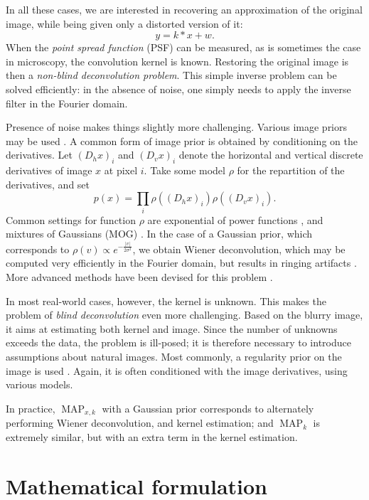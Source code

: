 \documentclass[french,a4paper]{article}
\theoremstyle{plain}
\theoremstyle{definition}
\theoremstyle{remark}
\DeclareMathOperator{\MAP}{MAP}
\begin{document}
In all these cases, we are interested in recovering an approximation of the original image, while being given only a distorted version of it:
\[
y = k * x + w.
\]
When the \emph{point spread function} (PSF) can be measured, as is sometimes the case in microscopy, the convolution kernel is known.
Restoring the original image is then a \emph{non-blind deconvolution problem}.
This simple inverse problem can be solved efficiently: in the absence of noise, one simply needs to apply the inverse filter in the Fourier domain.

Presence of noise makes things slightly more challenging.
Various image priors may be used \cite{sun2014good}.
A common form of image prior is obtained by conditioning on the derivatives. Let $(D_h x)_i$ and $(D_v x)_i$ denote the horizontal and vertical discrete derivatives of image $x$ at pixel $i$.
Take some model $\rho$ for the repartition of the derivatives, and set
\[
p(x) = \prod_i \rho((D_h x)_i) \rho((D_v x)_i) .
\]
Common settings for function $\rho$ are exponential of power functions \cite{krishnan2009fast,levin2009understanding}, and mixtures of Gaussians (MOG) \cite{levin2011efficient,fergus2006removing}.
In the case of a Gaussian prior, which corresponds to $\rho(v) \propto e^{-\frac{|v|}{2\sigma^2}}$, we obtain Wiener deconvolution, which may be computed very efficiently in the Fourier domain, but results in ringing artifacts \cite{shan2008high}.
More advanced methods have been devised for this problem \cite{sun2014good,schmidt2013discriminative}.



In most real-world cases, however, the kernel is unknown. This makes the problem of \emph{blind deconvolution} even more challenging.
Based on the blurry image, it aims at estimating both kernel and image.
Since the number of unknowns exceeds the data, the problem is ill-posed; it is therefore necessary to introduce assumptions about natural images.
Most commonly, a regularity prior on the image is used \cite{krishnan2009fast,fergus2006removing,levin2007blind,levi2009using,levin2011efficient,levin2009understanding}.
Again, it is often conditioned with the image derivatives, using various models.



In practice, $\MAP_{x,k}$ with a Gaussian prior corresponds to alternately performing Wiener deconvolution, and kernel estimation; and $\MAP_k$ is extremely similar, but with an extra term in the kernel estimation.


\section{Mathematical formulation}
\end{document}
